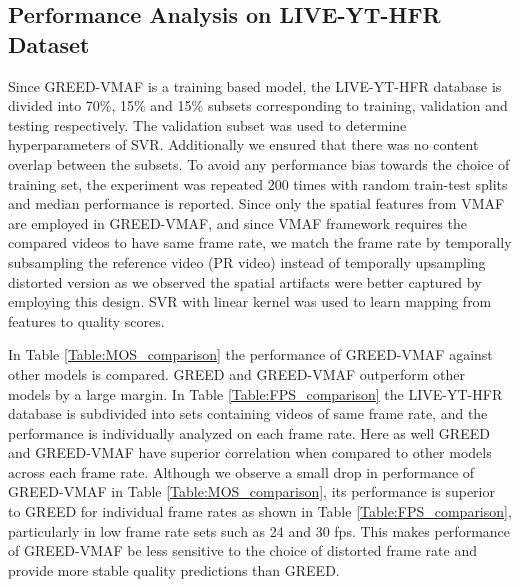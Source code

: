 \documentclass[conference]{IEEEtran}
\begin{document}
\subsection{Performance Analysis on LIVE-YT-HFR Dataset}
Since GREED-VMAF is a training based model, the LIVE-YT-HFR database is divided into 70\%, 15\% and 15\% subsets corresponding to training, validation and testing respectively. The validation subset was used to determine hyperparameters of SVR. Additionally we ensured that there was no content overlap between the subsets. To avoid any performance bias towards the choice of training set, the experiment was repeated 200 times with random train-test splits and median performance is reported. Since only the spatial features from VMAF are employed in GREED-VMAF, and since VMAF framework requires the compared videos to have same frame rate, we match the frame rate by temporally subsampling the reference video (PR video) instead of temporally upsampling distorted version as we observed the spatial artifacts were better captured by employing this design. SVR with linear kernel was used to learn mapping from features to quality scores.

In Table \ref{Table:MOS_comparison} the performance of GREED-VMAF against other models is compared. GREED and GREED-VMAF outperform other models by a large margin. In Table \ref{Table:FPS_comparison} the LIVE-YT-HFR database is subdivided into sets containing videos of same frame rate, and the performance is individually analyzed on each frame rate. Here as well GREED and GREED-VMAF have superior correlation when compared to other models across each frame rate. Although we observe a small drop in performance of GREED-VMAF in Table \ref{Table:MOS_comparison}, its performance is superior to GREED for individual frame rates as shown in Table \ref{Table:FPS_comparison}, particularly in low frame rate sets such as 24 and 30 fps. This makes performance of GREED-VMAF be less sensitive to the choice of distorted frame rate and provide more stable quality predictions than GREED.
\end{document}
